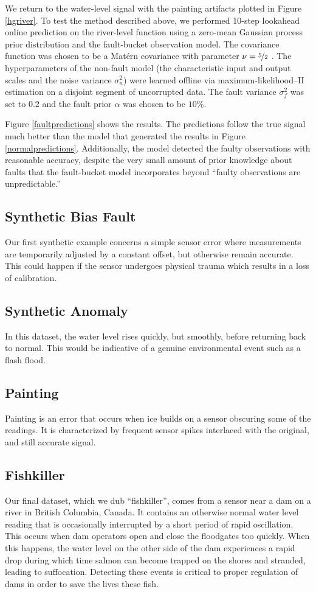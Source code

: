 \documentclass{article}
\begin{document}
We return to the water-level signal with the painting artifacts
plotted in Figure \ref{hgriver}.  To test the method described above,
we performed 10-step lookahead online prediction on the river-level
function using a zero-mean Gaussian process prior distribution and the
fault-bucket observation model.  The covariance function was chosen to
be a Mat\'{e}rn covariance with parameter $\nu = \nicefrac{5}{2}$
\cite{gpml}.  The hyperparameters of the non-fault model (the
characteristic input and output scales and the noise variance
$\sigma_n^2$) were learned offline via maximum-likelihood--II
estimation on a disjoint segment of uncorrupted data.  The fault
variance $\sigma_f^2$ was set to $0.2$ and the fault prior $\alpha$
was chosen to be $10\%$.

Figure \ref{faultpredictions} shows the results.  The predictions
follow the true signal much better than the model that generated the
results in Figure \ref{normalpredictions}.  Additionally, the model
detected the faulty observations with reasonable accuracy, despite the
very small amount of prior knowledge about faults that the
fault-bucket model incorporates beyond ``faulty observations are
unpredictable.''


\subsection{Synthetic Bias Fault}
Our first synthetic example concerns a simple sensor error where
measurements are temporarily adjusted by a constant offset, but otherwise remain
accurate. This could happen if the sensor undergoes physical trauma
which results in a loss of calibration.
\subsection{Synthetic Anomaly}
In this dataset, the water level rises quickly, but smoothly, before
returning back to normal. This would be indicative of a genuine
environmental event such as a flash flood.
\subsection{Painting}
Painting is an error that occurs when ice builds on a sensor obscuring
some of the readings. It is characterized by frequent sensor spikes
interlaced with the original, and still accurate signal.
\subsection{Fishkiller}
Our final dataset, which we dub ``fishkiller'', comes from a sensor near
a dam on a river in British Columbia, Canada. It contains an otherwise
normal water level reading that is occasionally interrupted by a short
period of rapid oscillation. This occurs when dam operators open and
close the floodgates too quickly. When this happens, the water level
on the other side of the dam experiences a rapid drop during which
time salmon can become trapped on the shores and stranded, leading to
suffocation. Detecting these events is critical to proper regulation
of dams in order to save the lives these fish.
\end{document}
